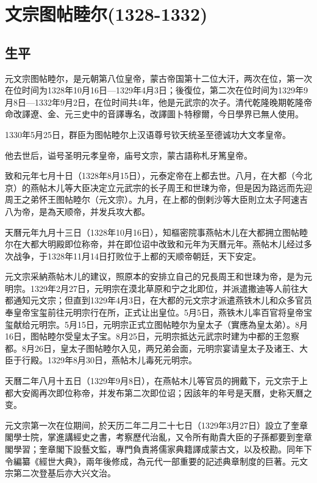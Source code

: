 
\section{文宗图帖睦尔\tiny(1328-1332)}

\subsection{生平}

元文宗图帖睦尔，是元朝第八位皇帝，蒙古帝国第十二位大汗，两次在位，第一次在位时间为1328年10月16日—1329年4月3日；後復位，第二次在位时间为1329年9月8日—1332年9月2日，在位时间共4年，他是元武宗的次子。清代乾隆晚期乾隆帝命改譯遼、金、元三史中的音譯專名，改譯圖卜特穆爾，今日學界已無人使用。

1330年5月25日，群臣为图帖睦尔上汉语尊号钦天统圣至德诚功大文孝皇帝。

他去世后，谥号圣明元孝皇帝，庙号文宗，蒙古語称札牙篤皇帝。

致和元年七月十日（1328年8月15日），元泰定帝在上都去世。八月，在大都（今北京）的燕帖木儿等大臣决定立元武宗的长子周王和世㻋为帝，但是因为路远而先迎周王之弟怀王图帖睦尔（元文宗）。九月，在上都的倒剌沙等大臣則立太子阿速吉八为帝，是為天顺帝，并发兵攻大都。

天曆元年九月十三日（1328年10月16日），知樞密院事燕帖木儿在大都拥立图帖睦尔在大都大明殿即位称帝，并在即位诏中改致和元年为天曆元年。燕帖木儿经过多次战争，于1328年11月14日打败位于上都的天顺帝朝廷，天下安定。

元文宗采納燕帖木儿的建议，照原本的安排立自己的兄長周王和世㻋为帝，是为元明宗。1329年2月27日，元明宗在漠北草原和宁之北即位，并派遣撒迪等人前往大都通知元文宗；但直到1329年4月3日，在大都的元文宗才派遣燕铁木儿和众多官员奉皇帝宝玺前往元明宗行在所，正式让出皇位。5月5日，燕铁木儿率百官将皇帝宝玺献给元明宗。5月15日，元明宗正式立图帖睦尔为皇太子（實應為皇太弟）。8月16日，图帖睦尔受皇太子宝。8月25日，元明宗抵达元武宗时建为中都的王忽察都。8月26日，皇太子图帖睦尔入见，两兄弟会面，元明宗宴请皇太子及诸王、大臣于行殿。1329年8月30日，燕帖木儿毒死元明宗。

天曆二年八月十五日（1329年9月8日），在燕帖木儿等官员的拥戴下，元文宗于上都大安阁再次即位称帝，并发布第二次即位诏；因該年的年号是天曆，史称天曆之变。

元文宗第一次在位期间，於天历二年二月二十七日（1329年3月27日）設立了奎章閣學士院，掌進講經史之書，考察歷代治亂，又令所有勛貴大臣的子孫都要到奎章閣學習；奎章閣下設藝文監，專門負責將儒家典籍譯成蒙古文，以及校勘。同年下令編纂《經世大典》，兩年後修成，為元代一部重要的記述典章制度的巨著。元文宗第二次登基后亦大兴文治。


